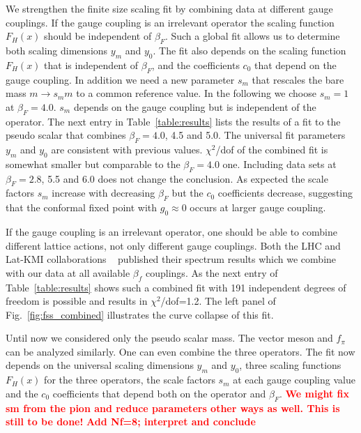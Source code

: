 \documentclass[aps,prl,twocolumn,]{revtex4}  %
\newcommand{\fig}[1]{Fig.~\ref{#1}}
\newcommand{\TODO}[1]{\textcolor{red}{{\bf #1}}}
\begin{document}
We strengthen  the finite size scaling fit   by combining data at different gauge couplings. If the gauge coupling is an irrelevant operator the scaling function $F_H(x)$ should be independent of $\beta_F$. Such a global fit allows us to determine both  scaling dimensions  $y_m$ and $y_0$. The fit also depends on the  scaling function $F_H(x)$ that is  independent of $\beta_F$, and the coefficients $c_0$ that depend on the gauge coupling. In addition we need a new parameter $s_m$ that rescales the bare mass $m \to s_m m$ to a common reference value. In the following we choose $s_m=1$ at $\beta_F=4.0$. $s_m$ depends on the gauge coupling but is independent of the operator. The next entry in Table~\ref{table:results} lists the results of a fit to the pseudo scalar that combines $\beta_F=4.0$, 4.5 and 5.0. The universal fit parameters $y_m$ and $y_0$ are consistent with previous values. $\chi^2$/dof of the combined fit is somewhat smaller but comparable to the   $\beta_F=4.0$ one. Including  data sets at $\beta_F=2.8$, 5.5 and 6.0 does not change the conclusion. As expected the  scale factors $s_m$ increase with decreasing $\beta_F$ but the $c_0$ coefficients decrease, suggesting that the conformal fixed point with $g_0\approx 0$ occurs at larger gauge coupling.

If the gauge coupling is an irrelevant operator, one should be able to combine different lattice actions, not only different gauge couplings. Both the LHC and Lat-KMI collaborations ~\protect\cite{Fodor:2011tu,Aoki:2012eq} published their spectrum results which we combine with our data at all available $\beta_f$ couplings. As the  next entry of Table~\ref{table:results} shows such a combined fit with 191 independent degrees of freedom is possible and results in $\chi^2$/dof=1.2.  The left panel of \fig{fig:fss_combined} illustrates the curve collapse of this fit. 

Until now we considered only the pseudo scalar mass. The vector meson and $f_\pi$ can be analyzed similarly. One can even combine the three operators. The fit now depends on the universal scaling dimensions  $y_m$ and $y_0$, three scaling functions $F_H(x)$ for the three operators, the scale factors $s_m$ at each gauge coupling value and the $c_0$ coefficients that depend both on the operator and $\beta_F$. 
\TODO{ We might fix sm from the pion and reduce parameters other ways as well. This is still to be done!} 
\TODO{Add Nf=8; interpret and conclude} 


\end{document}

